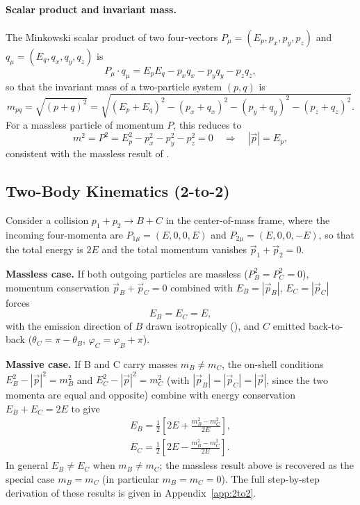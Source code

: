 \documentclass{article}
\begin{document}
\paragraph{Scalar product and invariant mass.} The Minkowski scalar product of two four-vectors $P_\mu = (E_p, p_x, p_y, p_z)$ and $q_\mu = (E_q, q_x, q_y, q_z)$ is
\begin{equation}
    P_\mu \cdot q_\mu = E_p E_q - p_x q_x - p_y q_y - p_z q_z,
\end{equation}
so that the invariant mass of a two-particle system $(p,q)$ is
\begin{equation}
    m_{pq} = \sqrt{(p+q)^2} = \sqrt{(E_p+E_q)^2 - (p_x+q_x)^2 - (p_y+q_y)^2 - (p_z+q_z)^2}.
\end{equation}
For a massless particle of momentum $P$, this reduces to
\begin{equation}
    m^2 = P^2 = E_p^2 - p_x^2 - p_y^2 - p_z^2 = 0 \quad \Rightarrow \quad |\vec{p}| = E_p,
\end{equation}
consistent with the massless result of .

\subsection{Two-Body Kinematics (2-to-2)}
\label{sssec:2to2}
Consider a collision $p_1 + p_2 \rightarrow B + C$ in the center-of-mass frame, where the incoming four-momenta are $P_{1\mu}=(E,0,0,E)$
 and $P_{2\mu}=(E,0,0,-E)$, so that the total energy is $2E$ and the total momentum vanishes $\vec{p}_1 + \vec{p}_2 = 0$.
\par\textbf{Massless case.} If both outgoing particles are massless ($P_B^2 = P_C^2 =0$), momentum conservation $\vec{p}_B + \vec{p}_C=0$ combined with $E_B=|\vec{p}_B|$, $E_C = |\vec{p}_C|$ forces
 \begin{equation}
     E_B = E_C = E,
 \end{equation}
with the emission direction of $B$ drawn isotropically (), and $C$ emitted back-to-back ($\theta_C = \pi - \theta_B$, $\varphi_C = \varphi_B + \pi$).
\par\textbf{Massive case.} If B and C carry masses $m_B \neq m_C$, the on-shell conditions $E_B^2 - |\vec{p}|^2 = m_B^2$ and $E_C^2 - |\vec{p}|^2 = m_C^2$ (with $|\vec{p}_B| = |\vec{p}_C| = |\vec{p}|$, since the two momenta are equal and opposite) combine with energy conservation $E_B+E_C=2E$ to give
\begin{equation}
\begin{gathered}
    E_B = \frac{1}{2}[2E + \frac{m_B^2 - m_C^2}{2E}],\\
    E_C = \frac{1}{2}[2E - \frac{m_B^2 - m_C^2}{2E}].
\end{gathered}
\end{equation}
In general $E_B \neq E_C$ when $m_B \neq m_C$; the massless result above is recovered as the special case $m_B = m_C$ (in particular $m_B = m_C = 0$). The full step-by-step derivation of these results is given in Appendix~\ref{app:2to2}.
\end{document}
